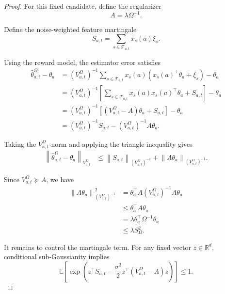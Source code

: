 \documentclass{article} %
\begin{document}
\begin{proof}
For this fixed candidate, define the regularizer
\begin{equation}
\label{eq:hyper-sn-proof-A}
A=\lambda\Omega^{-1}.
\end{equation}

Define the noise-weighted feature martingale
\begin{equation}
\label{eq:hyper-sn-proof-S}
S_{a,t}
=
\sum_{s\in\mathcal{T}_{a,t}}
x_s(a)\xi_s .
\end{equation}

Using the reward model, the estimator error satisfies
\begin{align}
\label{eq:hyper-sn-proof-error}
\widehat{\theta}_{a,t}^{\Omega}-\theta_a
&=
\left(V_{a,t}^{\Omega}\right)^{-1}
\sum_{s\in\mathcal{T}_{a,t}}
x_s(a)
\left(x_s(a)^\top\theta_a+\xi_s\right)
-\theta_a
\\
&=
\left(V_{a,t}^{\Omega}\right)^{-1}
\left[
\sum_{s\in\mathcal{T}_{a,t}}
x_s(a)x_s(a)^\top\theta_a
+
S_{a,t}
\right]
-\theta_a
\\
&=
\left(V_{a,t}^{\Omega}\right)^{-1}
\left[
\left(V_{a,t}^{\Omega}-A\right)\theta_a
+
S_{a,t}
\right]
-\theta_a
\\
&=
\left(V_{a,t}^{\Omega}\right)^{-1}
S_{a,t}
-
\left(V_{a,t}^{\Omega}\right)^{-1}
A\theta_a .
\end{align}

Taking the \(V_{a,t}^{\Omega}\)-norm and applying the triangle inequality gives
\begin{align}
\label{eq:hyper-sn-proof-triangle}
\left\|
\widehat{\theta}_{a,t}^{\Omega}-\theta_a
\right\|_{V_{a,t}^{\Omega}}
&\le
\left\|
S_{a,t}
\right\|_{\left(V_{a,t}^{\Omega}\right)^{-1}}
+
\left\|
A\theta_a
\right\|_{\left(V_{a,t}^{\Omega}\right)^{-1}} .
\end{align}

Since \(V_{a,t}^{\Omega}\succeq A\), we have
\begin{align}
\label{eq:hyper-sn-proof-bias}
\left\|
A\theta_a
\right\|_{\left(V_{a,t}^{\Omega}\right)^{-1}}^2
&=
\theta_a^\top A
\left(V_{a,t}^{\Omega}\right)^{-1}
A\theta_a
\\
&\le
\theta_a^\top A\theta_a
\\
&=
\lambda\theta_a^\top\Omega^{-1}\theta_a
\\
&\le
\lambda S_{\Omega}^2 .
\end{align}

It remains to control the martingale term.  For any fixed vector \(z\in\mathbb{R}^d\), conditional sub-Gaussianity implies
\begin{equation}
\label{eq:hyper-sn-proof-mgf}
\mathbb{E}
\!\left[
\exp\!\left(
z^\top S_{a,t}
-
\frac{\sigma^2}{2}
z^\top
\left(V_{a,t}^{\Omega}-A\right)
z
\right)
\right]
\le
1 .
\end{equation}


\end{proof}
\end{document}
